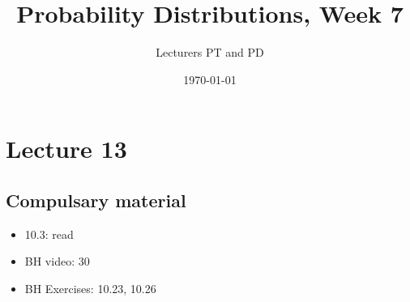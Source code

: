 \documentclass[a4paper,11pt]{article}
\author{Lecturers PT and PD
}
\date{\today}
\title{Probability Distributions, Week 7}
\begin{document}
\maketitle
\tableofcontents


\section{Lecture 13}

\subsection{Compulsary material}
\label{sec:compulsary-material}



\begin{itemize}
\item 10.3: read
\item BH video: 30
\item BH Exercises: 10.23, 10.26
\end{itemize}
\end{document}
